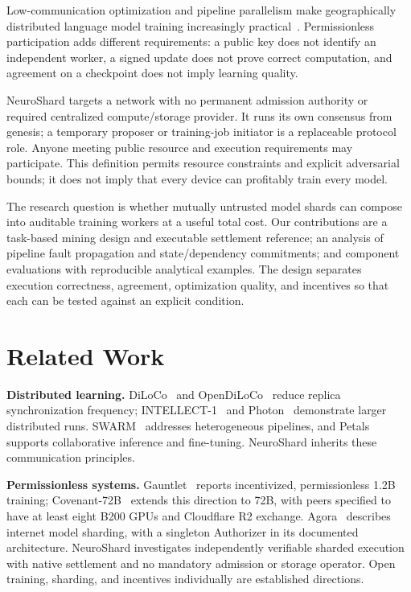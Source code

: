 \documentclass[conference]{IEEEtran}
\begin{document}
Low-communication optimization and pipeline parallelism make geographically distributed language model training increasingly practical~\cite{douillard2023diloco,jaghouar2024opendiloco,jaghouar2024intellect,ryabinin2023swarm}. Permissionless participation adds different requirements: a public key does not identify an independent worker, a signed update does not prove correct computation, and agreement on a checkpoint does not imply learning quality.

NeuroShard targets a network with no permanent admission authority or required centralized compute/storage provider. It runs its own consensus from genesis; a temporary proposer or training-job initiator is a replaceable protocol role. Anyone meeting public resource and execution requirements may participate. This definition permits resource constraints and explicit adversarial bounds; it does not imply that every device can profitably train every model.

The research question is whether mutually untrusted model shards can compose into auditable training workers at a useful total cost. Our contributions are a task-based mining design and executable settlement reference; an analysis of pipeline fault propagation and state/dependency commitments; and component evaluations with reproducible analytical examples. The design separates execution correctness, agreement, optimization quality, and incentives so that each can be tested against an explicit condition.

\section{Related Work}

\textbf{Distributed learning.} DiLoCo~\cite{douillard2023diloco} and OpenDiLoCo~\cite{jaghouar2024opendiloco} reduce replica synchronization frequency; INTELLECT-1~\cite{jaghouar2024intellect} and Photon~\cite{sani2024photon} demonstrate larger distributed runs. SWARM~\cite{ryabinin2023swarm} addresses heterogeneous pipelines, and Petals~\cite{borzunov2023petals} supports collaborative inference and fine-tuning. NeuroShard inherits these communication principles.

\textbf{Permissionless systems.} Gauntlet~\cite{lidin2025gauntlet} reports incentivized, permissionless 1.2B training; Covenant-72B~\cite{lidin2026covenant} extends this direction to 72B, with peers specified to have at least eight B200 GPUs and Cloudflare R2 exchange. Agora~\cite{avraham2026agora} describes internet model sharding, with a singleton Authorizer in its documented architecture. NeuroShard investigates independently verifiable sharded execution with native settlement and no mandatory admission or storage operator. Open training, sharding, and incentives individually are established directions.
\end{document}
